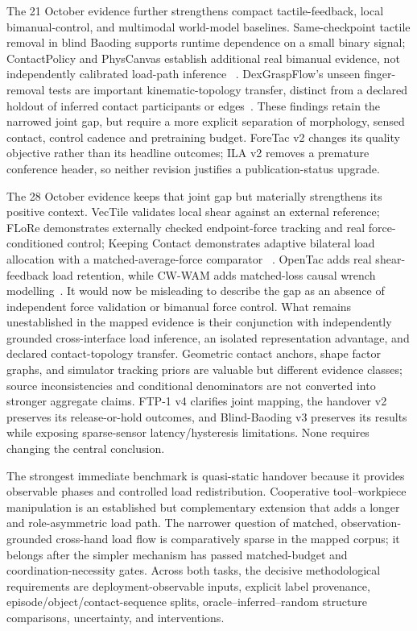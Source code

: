 The 21 October evidence further strengthens compact tactile-feedback, local
bimanual-control, and multimodal world-model baselines. Same-checkpoint tactile
removal in blind Baoding supports runtime dependence on a small binary signal;
ContactPolicy and PhysCanvas establish additional real bimanual evidence, not
independently calibrated load-path inference
~\cite{update2026blindbaoding,update2026contactpolicy,update2026physcanvas}.
DexGraspFlow's unseen finger-removal tests are important kinematic-topology
transfer, distinct from a declared holdout of inferred contact participants or
edges~\cite{update2026dexgraspflow}. These findings retain the narrowed joint gap,
but require a more explicit separation of morphology, sensed contact, control
cadence and pretraining budget. ForeTac v2 changes its quality objective rather
than its headline outcomes; ILA v2 removes a premature conference header, so
neither revision justifies a publication-status upgrade.

The 28 October evidence keeps that joint gap but materially strengthens its
positive context. VecTile validates local shear against an external reference;
FLoRe demonstrates externally checked endpoint-force tracking and real
force-conditioned control; Keeping Contact demonstrates adaptive bilateral load
allocation with a matched-average-force comparator
~\cite{update2026vectile,update2026flore,update2026keepingcontact}.
OpenTac adds real shear-feedback load retention, while CW-WAM adds matched-loss
causal wrench modelling~\cite{update2026opentac,update2026cwwam}.
It would now be misleading to describe the gap as an absence of independent force
validation or bimanual force control. What remains unestablished in the mapped
evidence is their conjunction with independently grounded cross-interface load
inference, an isolated representation advantage, and declared contact-topology
transfer. Geometric contact anchors, shape factor graphs, and simulator tracking
priors are valuable but different evidence classes; source inconsistencies and
conditional denominators are not converted into stronger aggregate claims.
FTP-1 v4 clarifies joint mapping, the handover v2 preserves its release-or-hold
outcomes, and Blind-Baoding v3 preserves its results while exposing sparse-sensor
latency/hysteresis limitations. None requires changing the central conclusion.

The strongest immediate benchmark is quasi-static handover because it provides
observable phases and controlled load redistribution. Cooperative tool--workpiece
manipulation is an established but complementary extension that adds a longer and
role-asymmetric load path. The narrower question of matched, observation-grounded
cross-hand load flow is comparatively sparse in the mapped corpus; it belongs
after the simpler mechanism has passed
matched-budget and coordination-necessity gates. Across both tasks, the decisive
methodological requirements are deployment-observable inputs, explicit label
provenance, episode/object/contact-sequence splits, oracle--inferred--random
structure comparisons, uncertainty, and interventions.

